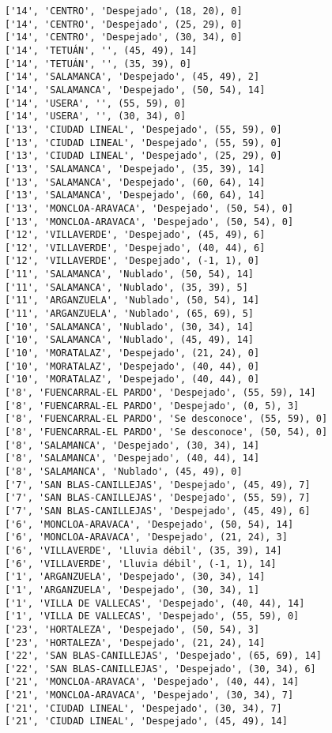 \documentclass[11pt]{article}
\begin{document}
\begin{Verbatim}[commandchars=\\\{\}]
['14', 'CENTRO', 'Despejado', (18, 20), 0]
['14', 'CENTRO', 'Despejado', (25, 29), 0]
['14', 'CENTRO', 'Despejado', (30, 34), 0]
['14', 'TETUÁN', '', (45, 49), 14]
['14', 'TETUÁN', '', (35, 39), 0]
['14', 'SALAMANCA', 'Despejado', (45, 49), 2]
['14', 'SALAMANCA', 'Despejado', (50, 54), 14]
['14', 'USERA', '', (55, 59), 0]
['14', 'USERA', '', (30, 34), 0]
['13', 'CIUDAD LINEAL', 'Despejado', (55, 59), 0]
['13', 'CIUDAD LINEAL', 'Despejado', (55, 59), 0]
['13', 'CIUDAD LINEAL', 'Despejado', (25, 29), 0]
['13', 'SALAMANCA', 'Despejado', (35, 39), 14]
['13', 'SALAMANCA', 'Despejado', (60, 64), 14]
['13', 'SALAMANCA', 'Despejado', (60, 64), 14]
['13', 'MONCLOA-ARAVACA', 'Despejado', (50, 54), 0]
['13', 'MONCLOA-ARAVACA', 'Despejado', (50, 54), 0]
['12', 'VILLAVERDE', 'Despejado', (45, 49), 6]
['12', 'VILLAVERDE', 'Despejado', (40, 44), 6]
['12', 'VILLAVERDE', 'Despejado', (-1, 1), 0]
['11', 'SALAMANCA', 'Nublado', (50, 54), 14]
['11', 'SALAMANCA', 'Nublado', (35, 39), 5]
['11', 'ARGANZUELA', 'Nublado', (50, 54), 14]
['11', 'ARGANZUELA', 'Nublado', (65, 69), 5]
['10', 'SALAMANCA', 'Nublado', (30, 34), 14]
['10', 'SALAMANCA', 'Nublado', (45, 49), 14]
['10', 'MORATALAZ', 'Despejado', (21, 24), 0]
['10', 'MORATALAZ', 'Despejado', (40, 44), 0]
['10', 'MORATALAZ', 'Despejado', (40, 44), 0]
['8', 'FUENCARRAL-EL PARDO', 'Despejado', (55, 59), 14]
['8', 'FUENCARRAL-EL PARDO', 'Despejado', (0, 5), 3]
['8', 'FUENCARRAL-EL PARDO', 'Se desconoce', (55, 59), 0]
['8', 'FUENCARRAL-EL PARDO', 'Se desconoce', (50, 54), 0]
['8', 'SALAMANCA', 'Despejado', (30, 34), 14]
['8', 'SALAMANCA', 'Despejado', (40, 44), 14]
['8', 'SALAMANCA', 'Nublado', (45, 49), 0]
['7', 'SAN BLAS-CANILLEJAS', 'Despejado', (45, 49), 7]
['7', 'SAN BLAS-CANILLEJAS', 'Despejado', (55, 59), 7]
['7', 'SAN BLAS-CANILLEJAS', 'Despejado', (45, 49), 6]
['6', 'MONCLOA-ARAVACA', 'Despejado', (50, 54), 14]
['6', 'MONCLOA-ARAVACA', 'Despejado', (21, 24), 3]
['6', 'VILLAVERDE', 'Lluvia débil', (35, 39), 14]
['6', 'VILLAVERDE', 'Lluvia débil', (-1, 1), 14]
['1', 'ARGANZUELA', 'Despejado', (30, 34), 14]
['1', 'ARGANZUELA', 'Despejado', (30, 34), 1]
['1', 'VILLA DE VALLECAS', 'Despejado', (40, 44), 14]
['1', 'VILLA DE VALLECAS', 'Despejado', (55, 59), 0]
['23', 'HORTALEZA', 'Despejado', (50, 54), 3]
['23', 'HORTALEZA', 'Despejado', (21, 24), 14]
['22', 'SAN BLAS-CANILLEJAS', 'Despejado', (65, 69), 14]
['22', 'SAN BLAS-CANILLEJAS', 'Despejado', (30, 34), 6]
['21', 'MONCLOA-ARAVACA', 'Despejado', (40, 44), 14]
['21', 'MONCLOA-ARAVACA', 'Despejado', (30, 34), 7]
['21', 'CIUDAD LINEAL', 'Despejado', (30, 34), 7]
['21', 'CIUDAD LINEAL', 'Despejado', (45, 49), 14]

\end{Verbatim}
\end{document}

